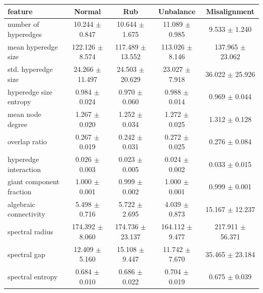 \begin{tabular}{lcccc}
\toprule
feature & Normal & Rub & Unbalance & Misalignment \\
\midrule
number of hyperedges & 10.244 $\pm$ 0.847 & 10.644 $\pm$ 1.675 & 11.089 $\pm$ 0.985 & 9.533 $\pm$ 1.240 \\
mean hyperedge size & 122.126 $\pm$ 8.574 & 117.489 $\pm$ 13.552 & 113.026 $\pm$ 8.146 & 137.965 $\pm$ 23.062 \\
std. hyperedge size & 24.266 $\pm$ 11.497 & 24.503 $\pm$ 20.629 & 23.027 $\pm$ 7.918 & 36.022 $\pm$ 25.926 \\
hyperedge size entropy & 0.984 $\pm$ 0.024 & 0.970 $\pm$ 0.060 & 0.988 $\pm$ 0.014 & 0.969 $\pm$ 0.044 \\
mean node degree & 1.267 $\pm$ 0.020 & 1.252 $\pm$ 0.034 & 1.272 $\pm$ 0.025 & 1.312 $\pm$ 0.128 \\
overlap ratio & 0.267 $\pm$ 0.019 & 0.242 $\pm$ 0.031 & 0.272 $\pm$ 0.025 & 0.276 $\pm$ 0.084 \\
hyperedge interaction & 0.026 $\pm$ 0.003 & 0.023 $\pm$ 0.005 & 0.024 $\pm$ 0.002 & 0.033 $\pm$ 0.015 \\
giant component fraction & 1.000 $\pm$ 0.001 & 0.999 $\pm$ 0.002 & 1.000 $\pm$ 0.001 & 0.999 $\pm$ 0.001 \\
algebraic connectivity & 5.498 $\pm$ 0.716 & 5.722 $\pm$ 2.695 & 4.039 $\pm$ 0.873 & 15.167 $\pm$ 12.237 \\
spectral radius & 174.392 $\pm$ 8.060 & 174.736 $\pm$ 23.137 & 164.112 $\pm$ 9.477 & 217.911 $\pm$ 56.371 \\
spectral gap & 12.409 $\pm$ 5.160 & 15.108 $\pm$ 9.447 & 11.742 $\pm$ 7.670 & 35.465 $\pm$ 23.184 \\
spectral entropy & 0.684 $\pm$ 0.010 & 0.686 $\pm$ 0.022 & 0.704 $\pm$ 0.019 & 0.675 $\pm$ 0.039 \\
\bottomrule
\end{tabular}
